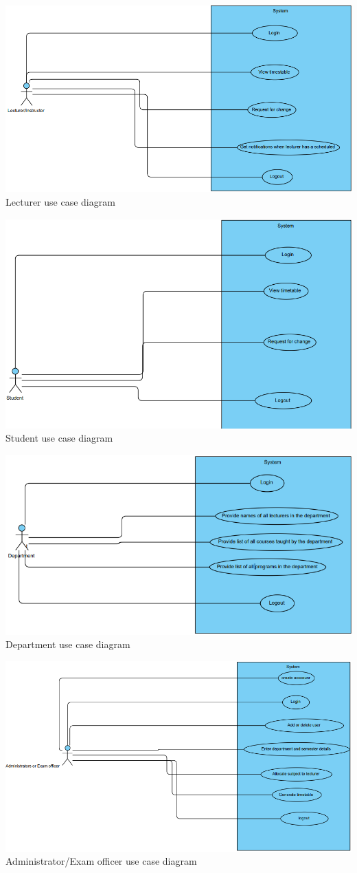 \documentclass{scrreprt}
\begin{document}
\begin{center}
\includegraphics[scale=0.6]{lecturer.png}
Lecturer use case diagram
\end {center}
\begin{center}
\includegraphics[scale=0.6]{student.png}
Student use case diagram
\end{center}
\begin{center}
\includegraphics[scale=0.6]{department.png}
Department use case diagram
\end{center}
\begin{center}
\includegraphics[scale=0.6]{admin.png}
Administrator/Exam officer use case diagram
\end{center}

 
\end{document}
